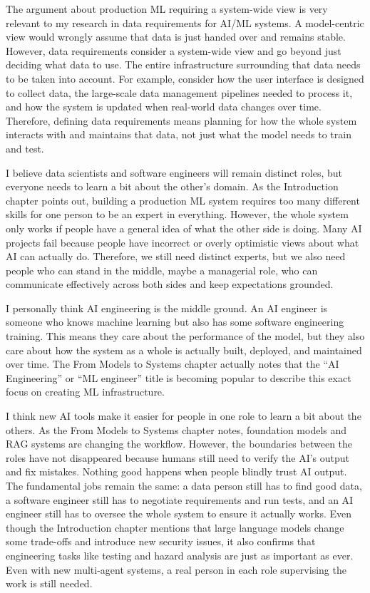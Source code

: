 The argument about production ML requiring a system-wide view is very relevant to my research in data requirements for AI/ML systems. A model-centric view would wrongly assume that data is just handed over and remains stable. However, data requirements consider a system-wide view and go beyond just deciding what data to use. The entire infrastructure surrounding that data needs to be taken into account. For example, consider how the user interface is designed to collect data, the large-scale data management pipelines needed to process it, and how the system is updated when real-world data changes over time. Therefore, defining data requirements means planning for how the whole system interacts with and maintains that data, not just what the model needs to train and test.

I believe data scientists and software engineers will remain distinct roles, but everyone needs to learn a bit about the other's domain. As the Introduction chapter points out, building a production ML system requires too many different skills for one person to be an expert in everything. However, the whole system only works if people have a general idea of what the other side is doing. Many AI projects fail because people have incorrect or overly optimistic views about what AI can actually do. Therefore, we still need distinct experts, but we also need people who can stand in the middle, maybe a managerial role, who can communicate effectively across both sides and keep expectations grounded.

I personally think AI engineering is the middle ground. An AI engineer is someone who knows machine learning but also has some software engineering training. This means they care about the performance of the model, but they also care about how the system as a whole is actually built, deployed, and maintained over time. The From Models to Systems chapter actually notes that the ``AI Engineering'' or ``ML engineer'' title is becoming popular to describe this exact focus on creating ML infrastructure. 

I think new AI tools make it easier for people in one role to learn a bit about the others. As the From Models to Systems chapter notes, foundation models and RAG systems are changing the workflow. However, the boundaries between the roles have not disappeared because humans still need to verify the AI's output and fix mistakes. Nothing good happens when people blindly trust AI output. The fundamental jobs remain the same: a data person still has to find good data, a software engineer still has to negotiate requirements and run tests, and an AI engineer still has to oversee the whole system to ensure it actually works. Even though the Introduction chapter mentions that large language models change some trade-offs and introduce new security issues, it also confirms that engineering tasks like testing and hazard analysis are just as important as ever. Even with new multi-agent systems, a real person in each role supervising the work is still needed.

